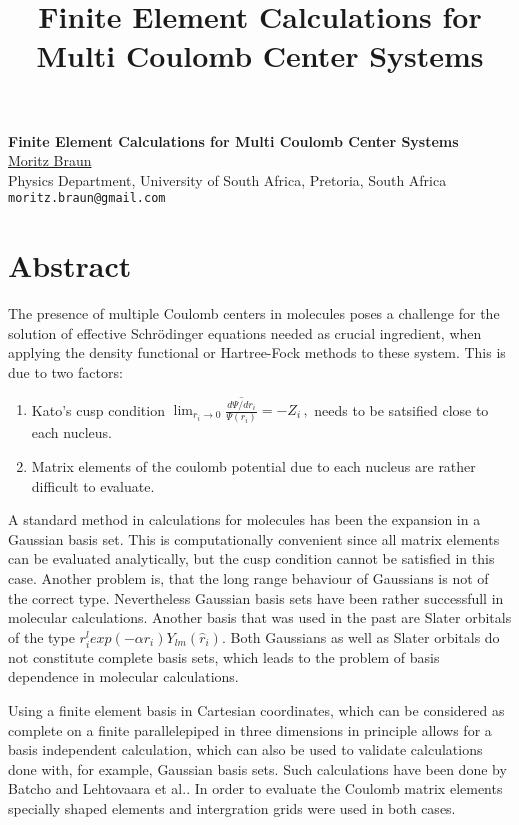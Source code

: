\title{Finite Element Calculations for Multi Coulomb Center Systems}
\author{} \institute{}

\begin{center}

\textbf{\Large Finite Element Calculations for Multi Coulomb Center Systems}\\
\vspace{10mm}
{\large \underline{ Moritz Braun}}\\
Physics Department, University of South Africa, Pretoria, South Africa\\
{\tt moritz.braun@gmail.com}

\end{center}

\section*{Abstract}

The presence of multiple Coulomb centers in molecules poses a challenge for the solution of effective Schr\"odinger equations needed as crucial ingredient, when applying the density functional or Hartree-Fock methods to these system. This is due to two factors:
\begin{enumerate}
\item Kato's cusp condition\cite{Kato} 
$
\lim_{r_i\to 0}
\overline
{\frac{d\Psi/dr_i}{\Psi(r_i)}}=-Z_i\,,
$
needs to be satsified close to each nucleus. 
\item Matrix elements of the coulomb potential due to each nucleus are rather  difficult to evaluate.
\end{enumerate}
A standard method in calculations for molecules has been the expansion in a Gaussian basis set. This is computationally convenient since all  matrix elements can be evaluated analytically, but the cusp condition cannot be satisfied in this case. Another problem is, that the long range behaviour of Gaussians is not of the correct type. Nevertheless Gaussian basis sets have been rather successfull  in molecular calculations.  Another basis that was used in the past  are Slater orbitals of the type $r_i^lexp(-\alpha r_i) Y_{lm}({\hat r_i})$. Both Gaussians as well as Slater orbitals do not constitute complete basis sets, which leads to the problem of basis dependence in molecular calculations.

Using a finite element basis in Cartesian coordinates, which can be considered as complete on a finite parallelepiped in three dimensions in principle allows for a basis independent calculation, which can also be used to validate calculations done with, for example, Gaussian basis sets. Such calculations have been done by Batcho\cite{Batcho} and  Lehtovaara et al.\cite{Lehto}. In order to evaluate the Coulomb matrix elements specially shaped elements and intergration grids were used in both cases.

